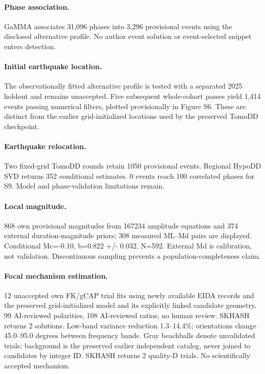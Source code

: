 \paragraph{Phase association.} GaMMA associates 31,096 phases into 3,296 provisional events using the disclosed alternative profile. No author event solution or event-selected snippet enters detection.
\paragraph{Initial earthquake location.} The observationally fitted alternative profile is tested with a separated 2025 holdout and remains unaccepted. Five subsequent whole-cohort passes yield 1,414 events passing numerical filters, plotted provisionally in Figure S6. These are distinct from the earlier grid-initialized locations used by the preserved TomoDD checkpoint.
\paragraph{Earthquake relocation.} Two fixed-grid TomoDD rounds retain 1050 provisional events. Regional HypoDD SVD returns 352 conditional estimates. 0 events reach 100 correlated phases for S9. Model and phase-validation limitations remain.
\paragraph{Local magnitude.} 868 own provisional magnitudes from 167234 amplitude equations and 374 external duration-magnitude priors; 308 measured ML--Md pairs are displayed. Conditional Mc=-0.10, b=0.822 +/- 0.032, N=592. External Md is calibration, not validation. Discontinuous sampling prevents a population-completeness claim.
\paragraph{Focal mechanism estimation.} 12 unaccepted own FK/gCAP trial fits using newly available EIDA records and the preserved grid-initialized model and its explicitly linked candidate geometry. 99 AI-reviewed polarities, 108 AI-reviewed ratios; no human review. SKHASH returns 2 solutions. Low-band variance reduction 1.3--14.4\%; orientations change 45.0--95.0 degrees between frequency bands. Gray beachballs denote unvalidated trials; background is the preserved earlier independent catalog, never joined to candidates by integer ID. SKHASH returns 2 quality-D trials. No scientifically accepted mechanism.

